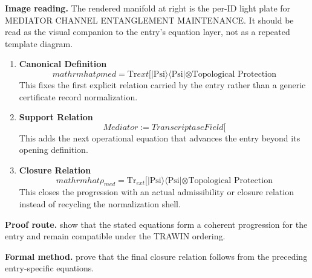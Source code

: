 \begin{samepage}
\noindent\begin{minipage}[t]{0.45\linewidth}
\vspace{0pt}
\raggedright
\scriptsize\textbf{Image reading.} The rendered manifold at right is the per-ID light plate for MEDIATOR CHANNEL ENTANGLEMENT MAINTENANCE. It should be read as the visual companion to the entry's equation layer, not as a repeated template diagram.\par
\end{minipage}\hfill
\begin{minipage}[t]{0.53\linewidth}
\vspace*{-0.10in}
\raggedright
{}
\end{minipage}
\end{samepage}

\clearpage


\begin{enumerate}[leftmargin=1.6em,itemsep=9pt,topsep=6pt]
\item \textbf{Canonical Definition}
\[
mathrm{hat}{\rho} {med} = \text{Tr} {ext}[\lvert \mathrm{Psi} \rangle \langle \mathrm{Psi}| \otimes \text{Topological Protection}
\]
This fixes the first explicit relation carried by the entry rather than a generic certificate record normalization.

\item \textbf{Support Relation}
\[
Mediator := TranscriptaseField[
\]
This adds the next operational equation that advances the entry beyond its opening definition.

\item \textbf{Closure Relation}
\[
mathrm{hat}{\rho}_{med} = \text{Tr}_{ext}[\lvert \mathrm{Psi} \rangle \langle \mathrm{Psi}| \otimes \text{Topological Protection}
\]
This closes the progression with an actual admissibility or closure relation instead of recycling the normalization shell.
\end{enumerate}

\textbf{Proof route.} show that the stated equations form a coherent progression for the entry and remain compatible under the TRAWIN ordering.

\textbf{Formal method.} prove that the final closure relation follows from the preceding entry-specific equations.

